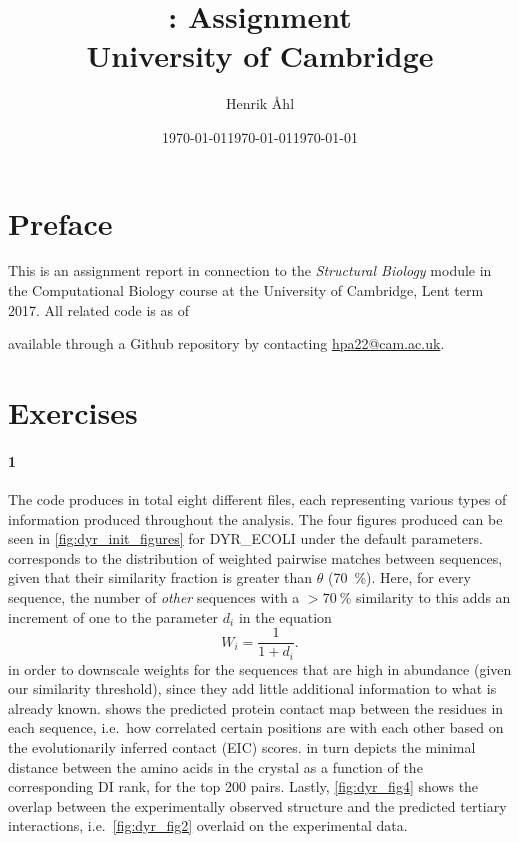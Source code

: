 \documentclass[11pt]{article}\usepackage[]{graphicx}\usepackage[]{color}
\title{
\bf \course: Assignment \ass \\[1em]
\small{University of Cambridge}
}
\author{Henrik Åhl}
\date{\today}
\theoremstyle{plain}
\newcommand{\course}{Structural Biology}
\newcommand{\term}{Lent term 2017}
\begin{document}
\date{\today}
\maketitle
\setcounter{page}{1}



\maketitle

\begin{multicols*}{2}
	\section*{Preface}
	This is an assignment report in connection to the \textit{\course}
	module in the Computational Biology course at the University of Cambridge,
	\term. All related code is as of \date{\today} available through a
	Github repository by contacting \href{mailto:hpa22@cam.ac.uk}{hpa22@cam.ac.uk}.
	
	
	\section*{Exercises}
	
	\paragraph{1}
	The code produces in total eight different files, each representing various types of information produced throughout the analysis. The four figures produced can be seen in \cref{fig:dyr_init_figures} for DYR\_ECOLI under the default parameters.  corresponds to the distribution of weighted pairwise matches between sequences, given that their similarity fraction is greater than $\theta$ (70~\%). Here, for every sequence, the number of \textit{other} sequences with a $> 70~\%$ similarity to this adds an increment of one to the parameter $d_i$ in the equation 
	\begin{equation*}
		W_i = \dfrac{1}{1 + d_i}.
	\end{equation*}
	in order to downscale weights for the sequences that are high in abundance (given our similarity threshold), since they add little additional information to what is already known.  shows the predicted protein contact map between the residues in each sequence, i.e.\ how correlated certain positions are with each other based on the evolutionarily inferred contact (EIC) scores.  in turn depicts the minimal distance between the amino acids in the crystal as a function of the corresponding DI rank,  for the top 200 pairs. Lastly, \cref{fig:dyr_fig4} shows the overlap between the experimentally observed structure and the predicted tertiary interactions, i.e.\ \cref{fig:dyr_fig2} overlaid on the experimental data.
	

\end{multicols*}
\end{document}
